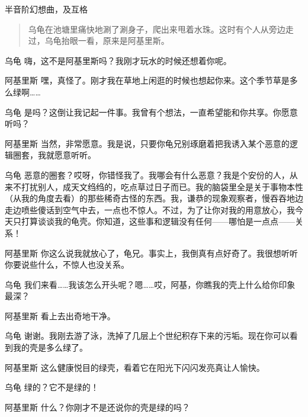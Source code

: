 
\begin{dialog}{半音阶幻想曲，及互格}

\begin{quote}
乌龟在池塘里痛快地涮了涮身子，爬出来甩着水珠。这时有个人从旁边走过，乌龟抬眼一看，原来是阿基里斯。
\end{quote}

\begin{dialogue}

\item[乌龟]嗨，这不是阿基里斯吗？我刚才玩水的时候还想着你呢。

\item[阿基里斯]嘿，真怪了。刚才我在草地上闲逛的时候也想起你来。这个季节草是多么绿啊……

\item[乌龟]是吗？这倒让我记起一件事。我曾有个想法，一直希望能和你共享。你愿意听吗？

\item[阿基里斯]当然，非常愿意。我是说，只要你龟兄别琢磨着把我诱入某个恶意的逻辑圈套，我就愿意听听。

\item[乌龟]恶意的圈套？哎呀，你错怪我了。我哪会有什么恶意？我是个安份的人，从来不打扰别人，成天文绉绉的，吃点草过日子而已。我的脑袋里全是关于事物本性（从我的角度去看）的那些稀奇古怪的东西。我，谦恭的现象观察者，慢吞吞地边走边喷些傻话到空气中去，一点也不惊人。不过，为了让你对我的用意放心，我今天只打算谈谈我的龟壳。你知道，这些事和逻辑没有任何——哪怕是一点点——关系！

\item[阿基里斯]你这么说我就放心了，龟兄。事实上，我倒真有点好奇了。我很想听听你要说些什么，不惊人也没关系。

\item[乌龟]我们来看……我该怎么开头呢？嗯……哎，阿基，你瞧我的壳上什么给你印象最深？

\item[阿基里斯]看上去出奇地干净。

\item[乌龟]谢谢。我刚去游了泳，洗掉了几层上个世纪积存下来的污垢。现在你可以看到我的壳是多么绿了。

\item[阿基里斯]这么健康悦目的绿壳，看着它在阳光下闪闪发亮真让人愉快。

\item[乌龟]绿的？它不是绿的！

\item[阿基里斯]什么？你刚才不是还说你的壳是绿的吗？


\end{dialogue}
\end{dialog}
